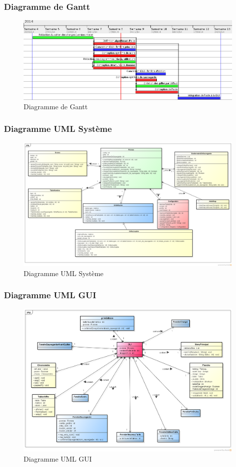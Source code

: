 \documentclass[12pt]{beamer}
\begin{document}
\begin{frame}
  \frametitle{Diagramme de Gantt}
  \begin{figure}[t]
    \centering
    \includegraphics[scale=0.38]{data/ganttDiagram}
    \caption{Diagramme de Gantt}
  \end{figure}
\end{frame}


\begin{frame}
  \frametitle{Diagramme UML Système}
  \begin{figure}
    \includegraphics[scale=0.20]{data/UMLDiagram}
    \caption{Diagramme UML Système}
  \end{figure}
\end{frame}

\begin{frame}
  \frametitle{Diagramme UML GUI}
  \begin{figure}
    \includegraphics[scale=0.23]{data/UMLGUI}
    \caption{Diagramme UML GUI}
  \end{figure}
\end{frame}
\end{document}

